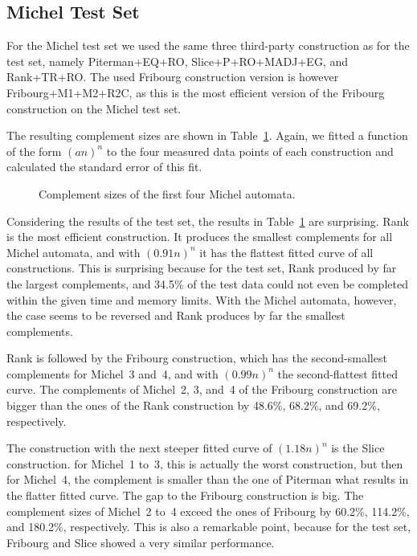 \subsection{Michel Test Set}
\label{5_external_michel}
For the Michel test set we used the same three third-party construction as for the \goal{} test set, namely Piterman+EQ+RO, Slice+P+RO+MADJ+EG, and Rank+TR+RO. The used Fribourg construction version is however Fribourg+M1+M2+R2C, as this is the most efficient version of the Fribourg construction on the Michel test set.

The resulting complement sizes are shown in Table~\ref{e.m.states}. Again, we fitted a function of the form $(an)^n$ to the four measured data points of each construction and calculated the standard error of this fit.

\begin{figure}[ht]
\centering

\caption{Complement sizes of the first four Michel automata.}
\label{e.m.states}
\end{figure}

Considering the results of the \goal{} test set, the results in Table~\ref{e.m.states} are surprising. Rank is the most efficient construction. It produces the smallest complements for all Michel automata, and with $(0.91n)^n$ it has the flattest fitted curve of all constructions. This is surprising because for the \goal{} test set, Rank produced by far the largest complements, and 34.5\% of the test data could not even be completed within the given time and memory limits. With the Michel automata, however, the case seems to be reversed and Rank produces by far the smallest complements.

Rank is followed by the Fribourg construction, which has the second-smallest complements for Michel~3 and~4, and with $(0.99n)^n$ the second-flattest fitted curve. The complements of Michel~2, 3, and~4 of the Fribourg construction are bigger than the ones of the Rank construction by 48.6\%, 68.2\%, and 69.2\%, respectively.

The construction with the next steeper fitted curve of $(1.18n)^n$ is the Slice construction. for Michel~1 to~3, this is actually the worst construction, but then for Michel~4, the complement is smaller than the one of Piterman what results in the flatter fitted curve. The gap to the Fribourg construction is big. The complement sizes of Michel~2 to~4 exceed the ones of Fribourg by 60.2\%, 114.2\%, and 180.2\%, respectively. This is also a remarkable point, because for the \goal{} test set, Fribourg and Slice showed a very similar performance.

